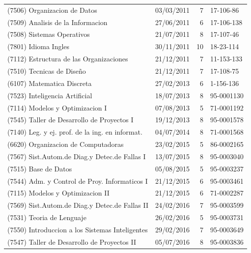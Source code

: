\documentclass[a4paper,11pt]{article}
\begin{document}
\begin{longtable}{|l|l|r|l|}
  (7506) Organizacion de Datos                      & 03/03/2011 & 7  & 17-106-86         \\
  (7509) Analisis de la Informacion                 & 27/06/2011 & 6  & 17-106-138        \\
  (7508) Sistemas Operativos                        & 21/07/2011 & 8  & 17-107-46         \\
  (7801) Idioma Ingles                              & 30/11/2011 & 10 & 18-23-114         \\
  (7112) Estructura de las Organizaciones           & 21/12/2011 & 7  & 11-153-133        \\
  (7510) Tecnicas de Diseño                         & 21/12/2011 & 7  & 17-108-75         \\
  (6107) Matematica Discreta                        & 27/02/2013 & 6  & 1-156-136         \\
  (7523) Inteligencia Artificial                    & 18/07/2013 & 8  & 95-0001130        \\
  (7114) Modelos y Optimizacion I                   & 07/08/2013 & 5  & 71-0001192        \\
  (7545) Taller de Desarrollo de Proyectos I        & 19/12/2013 & 8  & 95-0001578        \\
  (7140) Leg. y ej. prof. de la ing. en informat.   & 04/07/2014 & 8  & 71-0001568        \\
  (6620) Organizacion de Computadoras               & 23/02/2015 & 5  & 86-0002165        \\
  (7567) Sist.Autom.de Diag.y Detec.de Fallas I     & 13/07/2015 & 8  & 95-0003040        \\
  (7515) Base de Datos                              & 05/08/2015 & 5  & 95-0003237        \\
  (7544) Adm. y Control de Proy. Informaticos I     & 21/12/2015 & 6  & 95-0003461        \\
  (7115) Modelos y Optimizacion II                  & 21/12/2015 & 6  & 71-0002287        \\
  (7569) Sist.Autom.de Diag.y Detec.de Fallas II    & 24/02/2016 & 7  & 95-0003599        \\
  (7531) Teoria de Lenguaje                         & 26/02/2016 & 5  & 95-0003731        \\
  (7550) Introduccion a los Sistemas Inteligentes   & 29/02/2016 & 7  & 95-0003649        \\
  (7547) Taller de Desarrollo de Proyectos II       & 05/07/2016 & 8  & 95-0003836        \\

\end{longtable}
\end{document}

